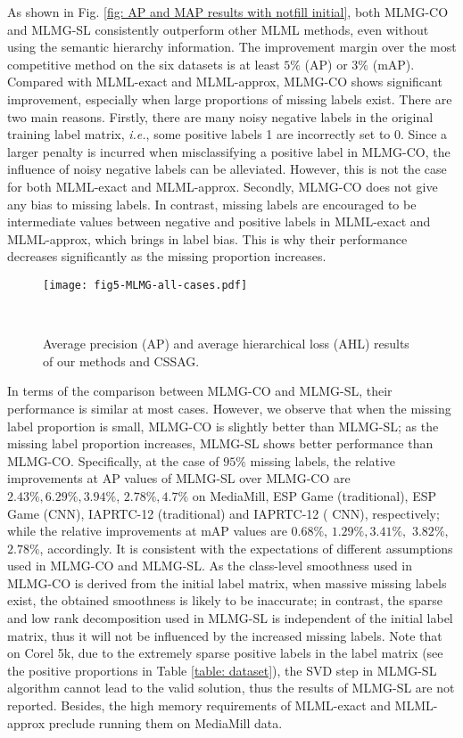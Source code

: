\documentclass[twocolumn]{svjour3}          %
\begin{document}
As shown in Fig. \ref{fig: AP and MAP results with notfill initial}, 
both MLMG-CO and MLMG-SL consistently outperform other MLML methods, even without using the semantic hierarchy information.
The improvement margin over the most competitive method on the six datasets is at least $5\%$ (AP) or $3\%$ (mAP). Compared with MLML-exact and MLML-approx, MLMG-CO shows significant improvement, especially when large proportions of missing labels exist. There are two main reasons. 
Firstly, there are many noisy negative labels in the original training label matrix, {\it i.e.}, some positive labels 1 are incorrectly set to 0. Since a larger penalty is incurred when misclassifying a positive label in MLMG-CO, the influence of noisy negative labels can be alleviated. However, this is not the case for both MLML-exact and MLML-approx. 
Secondly, MLMG-CO does not give any bias to missing labels. In contrast, missing labels are encouraged to be intermediate values between negative and positive labels in MLML-exact and MLML-approx, which brings in label bias. This is why their performance decreases significantly as the missing proportion increases.

\begin{figure*}[tbph]
\centering
\texttt{[image: fig5-MLMG-all-cases.pdf]}
\caption{Average precision (AP) and average hierarchical loss (AHL) results of our methods and CSSAG.}
\label{fig: AP, mAP and AHL results of all cases}
~\vspace{-.2in}
\end{figure*}



In terms of the comparison between MLMG-CO and MLMG-SL, their performance is similar at most cases. However, we observe that when the missing label proportion is small, MLMG-CO is slightly better than MLMG-SL; as the missing label proportion increases, MLMG-SL shows better performance than MLMG-CO. Specifically, at the case of $95\%$ missing labels, the relative improvements at AP values of MLMG-SL over MLMG-CO are $2.43\%, 6.29\%, 3.94\%$,  $2.78\%, 4.7\%$ on MediaMill, ESP Game (traditional), ESP Game (CNN), IAPRTC-12 (traditional) and IAPRTC-12 ( CNN), respectively; while the relative improvements at mAP values are $0.68\%$, $1.29\%, 3.41\%,$ $3.82\%,$ $2.78\%$,  accordingly. 
It is consistent with the expectations of different assumptions used in MLMG-CO and MLMG-SL. As the class-level smoothness used in MLMG-CO is derived from the initial label matrix, when massive missing labels exist, the obtained smoothness is likely to be inaccurate; in contrast, the sparse and low rank decomposition used in MLMG-SL is independent of the initial label matrix, thus it will not be influenced by the increased missing labels. 
%
Note that on Corel 5k, due to the extremely sparse positive labels in the label matrix (see the positive proportions in Table \ref{table: dataset}), the SVD step in MLMG-SL algorithm cannot lead to the valid solution, thus the results of MLMG-SL are not reported. 
Besides, the high memory requirements of MLML-exact and MLML-approx preclude running them on MediaMill data. 
\end{document}
